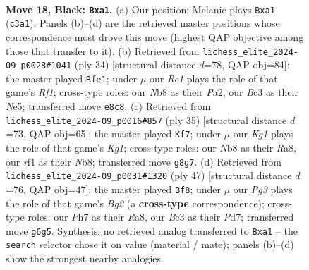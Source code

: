 \documentclass[11pt]{article}
\begin{document}
\clearpage

\begin{figure}[p]\centering
\begin{subfigure}{0.46\textwidth}\centering
\resizebox{\linewidth}{!}{%
\newchessgame
\chessboard[
  setfen={rn2r1k1/p1p1Bp1p/3P2p1/8/2Q1P1q1/2b5/P4P1P/R4R1K b - - 2 18},
  showmover=false,
  pgfstyle=straightmove, color=movearrow, markmove={c3-a1}
]}
\caption{}
\end{subfigure}\hfill
\begin{subfigure}{0.46\textwidth}\centering
\resizebox{\linewidth}{!}{%
\newchessgame
\chessboard[
  setfen={r2r2k1/pp1b1pp1/4p2p/2q1N3/4Q3/2P3P1/PP3PP1/R4RK1 w - - 2 18},
  showmover=false,
  pgfstyle=straightmove, color=movearrow, markmove={f1-e1}
]}
\caption{}
\end{subfigure}
\\[4pt]
\begin{subfigure}{0.46\textwidth}\centering
\resizebox{\linewidth}{!}{%
\newchessgame
\chessboard[
  setfen={rn3rk1/pp2p3/5p1B/2pp1Q2/3P3P/2q5/P1P3P1/R4K1R b - - 0 18},
  showmover=false,
  pgfstyle=straightmove, color=movearrow, markmove={g8-f7}
]}
\caption{}
\end{subfigure}\hfill
\begin{subfigure}{0.46\textwidth}\centering
\resizebox{\linewidth}{!}{%
\newchessgame
\chessboard[
  setfen={r5k1/p2p2bp/1p1P1pp1/2q5/Q4P2/P2Br3/6PP/3R1R1K b - - 2 24},
  showmover=false,
  pgfstyle=straightmove, color=movearrow, markmove={g7-f8}
]}
\caption{}
\end{subfigure}
\caption{\textbf{Move 18, Black: \texttt{Bxa1}.} (a) Our position; Melanie plays \texttt{Bxa1} (\texttt{c3a1}). Panels (b)--(d) are the retrieved master positions whose correspondence most drove this move (highest QAP objective among those that transfer to it). (b) Retrieved from \texttt{lichess\_elite\_2024-09\_p0028\#1041} (ply 34) [structural distance $d$=78, QAP obj=84]: the master played \texttt{Rfe1}; under $\mu$ our \emph{Re1} plays the role of that game's \emph{Rf1}; cross-type roles: our \emph{N}b8 as their \emph{P}a2, our \emph{B}c3 as their \emph{N}e5; transferred move \texttt{e8c8}. (c) Retrieved from \texttt{lichess\_elite\_2024-09\_p0016\#857} (ply 35) [structural distance $d$=73, QAP obj=65]: the master played \texttt{Kf7}; under $\mu$ our \emph{Kg1} plays the role of that game's \emph{Kg1}; cross-type roles: our \emph{N}b8 as their \emph{R}a8, our \emph{r}f1 as their \emph{N}b8; transferred move \texttt{g8g7}. (d) Retrieved from \texttt{lichess\_elite\_2024-09\_p0031\#1320} (ply 47) [structural distance $d$=76, QAP obj=47]: the master played \texttt{Bf8}; under $\mu$ our \emph{Pg3} plays the role of that game's \emph{Bg2} (a \textbf{cross-type} correspondence); cross-type roles: our \emph{P}h7 as their \emph{R}a8, our \emph{B}c3 as their \emph{P}d7; transferred move \texttt{g6g5}. Synthesis: no retrieved analog transferred to \texttt{Bxa1} -- the \texttt{search} selector chose it on value (material / mate); panels (b)--(d) show the strongest nearby analogies.}
\label{fig:thought-m35}
\end{figure}
\end{document}
